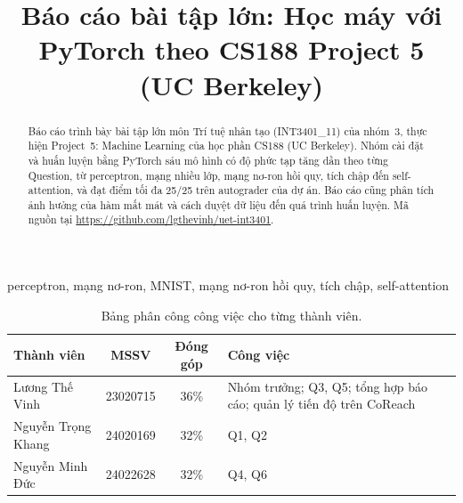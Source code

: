 \documentclass[conference]{IEEEtran}
\begin{document}
\title{Báo cáo bài tập lớn: Học máy với PyTorch theo CS188 Project 5 (UC Berkeley)}

\author{
\and
{}
\and
{}
}

\maketitle

\renewcommand{\abstractname}{Tóm tắt}
\renewcommand{\figurename}{Hình}
\renewcommand{\tablename}{Bảng}
\renewcommand{\IEEEkeywordsname}{Từ khoá}
\renewcommand{\refname}{Tài liệu tham khảo}

\begin{abstract}
Báo cáo trình bày bài tập lớn môn Trí tuệ nhân tạo (INT3401\_11) của nhóm~3,
thực hiện Project~5: Machine Learning của học phần CS188 (UC Berkeley).
Nhóm cài đặt và huấn luyện bằng PyTorch sáu mô hình có độ phức tạp tăng
dần theo từng Question, từ perceptron, mạng nhiều lớp, mạng nơ-ron hồi quy, tích chập đến
self-attention, và đạt điểm tối đa 25/25 trên autograder của dự án. Báo cáo
cũng phân tích ảnh hưởng của hàm mất mát và cách duyệt dữ liệu đến quá trình
huấn luyện. Mã nguồn tại
\url{https://github.com/lgthevinh/uet-int3401}.
\end{abstract}

\begin{IEEEkeywords}
perceptron, mạng nơ-ron, MNIST, mạng nơ-ron hồi quy, tích chập, self-attention
\end{IEEEkeywords}

\begin{table}[!ht]
    \centering
    \renewcommand{\arraystretch}{1.15}
    \footnotesize
    \caption{Bảng phân công công việc cho từng thành viên.}
    \label{tab:assignment}
    \begin{tabularx}{\columnwidth}{@{}lccX@{}}
    \toprule
        \textbf{Thành viên} & \textbf{MSSV} & \textbf{Đóng góp} & \textbf{Công việc} \\
    \midrule
        Lương Thế Vinh & 23020715 & 36\% & Nhóm trưởng; Q3, Q5; tổng hợp báo cáo; quản lý tiến độ trên CoReach \\
        Nguyễn Trọng Khang & 24020169 & 32\% & Q1, Q2 \\
        Nguyễn Minh Đức & 24022628 & 32\% & Q4, Q6 \\
    \bottomrule
    \end{tabularx}
\end{table}
\end{document}
